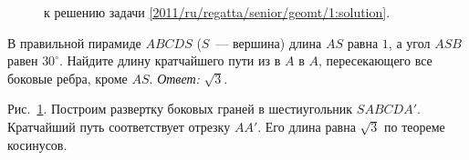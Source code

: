 \ifsolution
\begin{figure}\centering
    \caption{к решению задачи \ref{2011/ru/regatta/senior/geomt/1:solution}.}
    \label{2011/ru/regatta/senior/geomt/1:solution:fig}
\end{figure}%
\fi %

\problem
В правильной пирамиде $ABCDS$ ($S$~--- вершина) длина $AS$ равна $1$, а угол
$ASB$ равен $30^\circ$.
Найдите длину кратчайшего пути из в $A$ в $A$, пересекающего все боковые ребра,
кроме $AS$.
\solution
\label{2011/ru/regatta/senior/geomt/1:solution}%
\emph{Ответ:} $\sqrt{3}$.
\par
Рис.~\ref{2011/ru/regatta/senior/geomt/1:solution:fig}.
Построим развертку боковых граней в шестиугольник $SABCDA'$.
Кратчайший путь соответствует отрезку $AA'$.
Его длина равна $\sqrt{3}$ по теореме косинусов.
\endproblem
